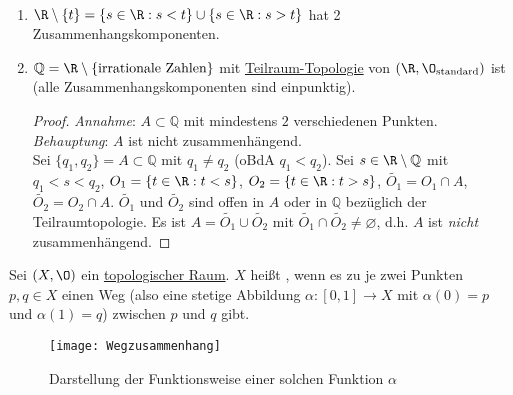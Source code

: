 \begin{example}
  \
  \begin{enumerate}
    \item \( \R \setminus \{ t \} = \{ s \in \R : s < t \} \cup \{ s \in \R : s > t \} \) hat 2 Zusammenhangskomponenten.
    \item \( \mathbb{Q} = \R \setminus \{ \text{irrationale Zahlen} \} \) mit \hyperref[def:teilraumtopologie]{Teilraum-Topologie} von \( (\R, \O_\text{standard}) \) ist  (alle Zusammenhangskomponenten sind einpunktig). \\
    \begin{proof}
      \emph{Annahme}: \( A \subset \mathbb{Q} \) mit mindestens \( 2 \) verschiedenen Punkten. \\
      \emph{Behauptung}: \( A \) ist nicht zusammenhängend. \\
      Sei \( \{ q_1, q_2 \} = A \subset \mathbb{Q} \) mit \( q_1 \neq q_2 \) (oBdA \( q_1 < q_2 \)). Sei \( s \in \R \setminus \mathbb{Q} \) mit \( q_1 < s < q_2 \), \( O_1 = \{ t \in \R: t < s \} \), \( O_2 = \{ t \in \R : t > s \} \), \( \widetilde{O_1} = O_1 \cap A \), \( \widetilde{O_2} = O_2 \cap A \). \( \widetilde{O_1} \) und \( \widetilde{O_2} \) sind offen in \( A \) oder in \( \mathbb{Q} \) bezüglich der Teilraumtopologie. Es ist \( A = \widetilde{O_1} \cup \widetilde{O_2} \) mit \( \widetilde{O_1} \cap \widetilde{O_2} \neq \varnothing \), d.h. \( A \) ist \emph{nicht} zusammenhängend.
    \end{proof}
  \end{enumerate}
\end{example}

\begin{definition}[Weg-Zusammenhängend]\label{def:wegzusammenhaengend}
  Sei \( (X, \O) \) ein \hyperref[def:topologie]{topologischer Raum}. \( X \) heißt , wenn es zu je zwei Punkten \( p, q \in X \) einen Weg (also eine stetige Abbildung \( \alpha : [0,1] \to X \) mit \( \alpha(0) = p \) und \( \alpha(1) = q \)) zwischen \( p \) und \( q \) gibt.
  \begin{figure}[H]
    \texttt{[image: Wegzusammenhang]}
    \caption{Darstellung der Funktionsweise einer solchen Funktion \( \alpha \)}
  \end{figure}
\end{definition}

